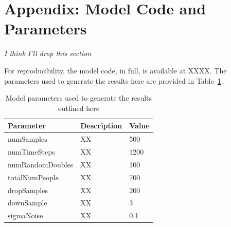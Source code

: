 \documentclass[runningheads]{llncs}
\begin{document}
\section*{Appendix: Model Code and Parameters}

\textit{I think I'll drop this section}

For reproducibility, the model code, in full, is available at XXXX. The parameters used to generate the results here are provided in Table~\ref{tab:parameters}.

\begin{table}[] \caption{Model parameters used to generate the results outlined here}
\begin{center}
\begin{tabular}{l p{} l}
Parameter & Description & Value \\ \hline 
numSamples & XX &  500 \\
numTimeSteps & XX &  1200 \\
numRandomDoubles & XX &  100 \\
totalNumPeople & XX &  700 \\
dropSamples & XX &  200 \\
downSample & XX &  3 \\
sigmaNoise & XX &  0.1 \\
\end{tabular}
\end{center} \label{tab:parameters} \end{table}%
\end{document}
